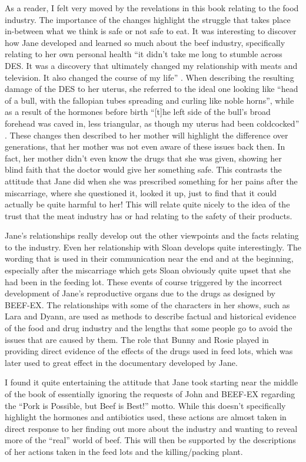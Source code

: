 \documentclass{article}
\begin{document}
As a reader, I felt very moved by the revelations in this book relating to
the food industry.
The importance of the changes highlight the struggle that takes
place in-between what we think is safe or not safe to eat. It was
interesting to discover how Jane developed and learned so much about the
beef industry, specifically relating to her own personal health ``it
didn't take me long to stumble across DES. It was a discovery that
ultimately changed my relationship with meats and television. It also
changed the course of my life'' \cite{ozeki1998my}. When describing the
resulting damage of the DES to her uterus, she referred to the ideal one
looking like ``head of a bull, with the fallopian tubes spreading and
curling like noble horns'', while as a result of the hormones before birth
``[t]he left side of the bull’s broad forehead was caved in, less
triangular, as though my uterus had been coldcocked'' \cite{ozeki1998my}.
These changes then described to her mother will highlight the difference
over generations, that her mother was not even aware of these issues back
then. In fact, her mother didn't even know the drugs that she was given,
showing her blind faith that the doctor would give her something safe. This
contrasts the attitude that Jane did when she was prescribed something for
her pains after the miscarriage, where she questioned it, looked it up, just
to find that it could actually be quite harmful to her! This will relate
quite nicely to the idea of the trust that the meat industry has or had
relating to the safety of their products.

Jane's relationships really develop out the other viewpoints and the facts
relating to the industry. Even her relationship with Sloan develops quite
interestingly. The wording that is used in their communication near the end
and at the beginning, especially after the miscarriage which gets Sloan
obviously quite upset that she had been in the feeding lot. These events of
course triggered by the incorrect development of Jane's reproductive organs
due to the drugs as designed by BEEF-EX. The relationships with some of the
characters in her shows, such as Lara and Dyann, are used as methods to
describe factual and historical evidence of the food and drug industry and
the lengths that some people go to avoid the issues that are caused by them.
The role that Bunny and Rosie played in providing direct evidence of the
effects of the drugs used in feed lots, which was later used to great effect
in the documentary developed by Jane.

I found it quite entertaining the attitude that Jane took starting near the
middle of the book of essentially ignoring the requests of John and BEEF-EX
regarding the ``Pork is Possible, but Beef is Best!'' \cite{ozeki1998my}
motto. While this doesn't specifically highlight the hormones and
antibiotics used, these actions are almost taken in direct response to her
finding out more about the industry and wanting to reveal more of the
``real'' world of beef. This will then be supported by the descriptions of
her actions taken in the feed lots and the killing/packing plant.
\end{document}

